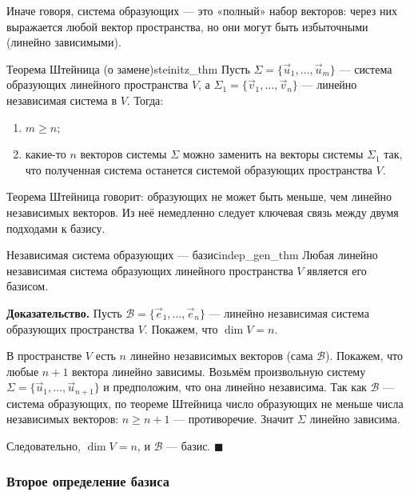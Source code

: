 \documentclass[12pt,a4paper]{article}
\newenvironment{myproof}{\noindent\textbf{Доказательство.}}{\hfill$\blacksquare$}
\begin{document}
Иначе говоря, система образующих --- это «полный» набор векторов:
через них выражается любой вектор пространства, но они могут быть
избыточными (линейно зависимыми).

\begin{theorem}{Теорема Штейница (о замене)}{steinitz_thm}
  Пусть $\Sigma = \{\vec{u}_1, \dots, \vec{u}_m\}$ --- система
  образующих линейного пространства $V$, а $\Sigma_1 = \{\vec{v}_1,
  \dots, \vec{v}_n\}$ --- линейно независимая система в $V$. Тогда:
  \begin{enumerate}
    \item $m \ge n$;
    \item какие-то $n$ векторов системы $\Sigma$ можно заменить на
      векторы системы $\Sigma_1$ так, что полученная система останется
      системой образующих пространства $V$.
  \end{enumerate}
\end{theorem}

Теорема Штейница говорит: образующих не может быть меньше, чем линейно
независимых векторов. Из неё немедленно следует ключевая связь между
двумя подходами к базису.

\begin{theorem}{Независимая система образующих --- базис}{indep_gen_thm}
  Любая линейно независимая система образующих линейного пространства
  $V$ является его базисом.
\end{theorem}

\begin{myproof}
  Пусть $\mathcal{B} = \{\vec{e}_1, \dots, \vec{e}_n\}$ --- линейно
  независимая система образующих пространства $V$. Покажем, что $\dim
  V = n$.

  В пространстве $V$ есть $n$ линейно независимых векторов (сама
  $\mathcal{B}$). Покажем, что любые $n+1$ вектора линейно зависимы.
  Возьмём произвольную систему $\Sigma = \{\vec{u}_1, \dots,
  \vec{u}_{n+1}\}$ и предположим, что она линейно независима. Так как
  $\mathcal{B}$ --- система образующих, по теореме Штейница число
  образующих не меньше числа независимых векторов: $n \ge n + 1$ ---
  противоречие. Значит $\Sigma$ линейно зависима.

  Следовательно, $\dim V = n$, и $\mathcal{B}$ --- базис.
\end{myproof}

\subsubsection*{Второе определение базиса}
\end{document}

